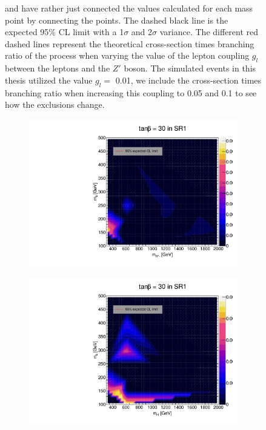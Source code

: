 \documentclass[12pt, a4paper]{book}
\begin{document}
\begin{figure}[!ht]
{   and have rather just connected the values calculated for each mass point by connecting the points. The dashed black line is the expected 95\% CL limit with a 1$\sigma$ and 2$\sigma$ variance. 
   The different red dashed lines represent the theoretical cross-section times branching ratio of the process when varying the value of the lepton coupling $g_l$ between the leptons and the $Z'$ boson. The simulated events in this thesis utilized the value $g_l=$ 0.01, we include the cross-section times branching ratio when increasing this coupling to 0.05 and 0.1 to see how the exclusions change.  }
\end{figure}

\begin{figure}[!ht]
	\centering
	\begin{subfigure}[b]{0.49\textwidth}
      \centering
      \includegraphics[width=1\textwidth]{Limits/Model_independent/50-100/2HDM/2HDM_ee_tb30.pdf}
   \end{subfigure}
   \hfill
   \begin{subfigure}[b]{0.49\textwidth}
      \centering
      \includegraphics[width=1\textwidth]{Limits/Model_independent/50-100/2HDM/2HDM_uu_tb30.pdf}

\end{subfigure}
\end{figure}
\end{document}
